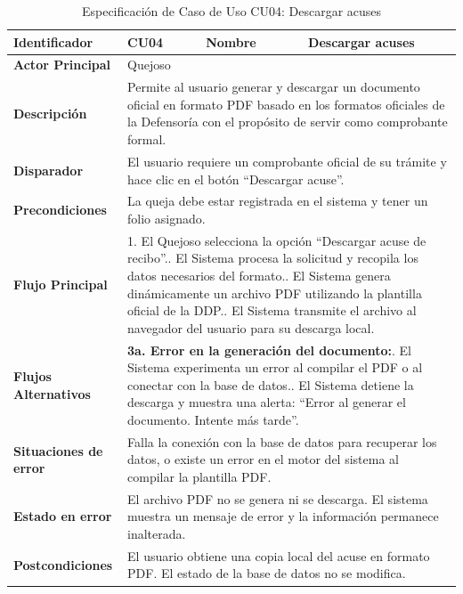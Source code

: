 \begingroup
\setlength{\parskip}{0pt}
\begin{longtable}{|p{3.5cm}|p{2cm}|p{2.5cm}|p{7cm}|}
\caption{Especificación de Caso de Uso CU04: Descargar acuses}
\label{tab:cu04_descargar_acuses} \\
\hline
\textbf{Identificador} & CU04 & \textbf{Nombre} & Descargar acuses \\ \hline
\textbf{Actor Principal} & \multicolumn{3}{p{11.5cm}|}{Quejoso} \\ \hline
\textbf{Descripción} & \multicolumn{3}{p{11.5cm}|}{Permite al usuario generar y descargar un documento oficial en formato PDF basado en los formatos oficiales de la Defensoría con el propósito de servir como comprobante formal.} \\ \hline
\textbf{Disparador} & \multicolumn{3}{p{11.5cm}|}{El usuario requiere un comprobante oficial de su trámite y hace clic en el botón ``Descargar acuse''.} \\ \hline
\textbf{Precondiciones} & \multicolumn{3}{p{11.5cm}|}{La queja debe estar registrada en el sistema y tener un folio asignado.} \\ \hline
\textbf{Flujo Principal} & \multicolumn{3}{p{11.5cm}|}{1. El Quejoso selecciona la opción ``Descargar acuse de recibo''.\newline 2. El Sistema procesa la solicitud y recopila los datos necesarios del formato.\newline 3. El Sistema genera dinámicamente un archivo PDF utilizando la plantilla oficial de la DDP.\newline 4. El Sistema transmite el archivo al navegador del usuario para su descarga local.} \\ \hline
\textbf{Flujos Alternativos} & \multicolumn{3}{p{11.5cm}|}{\textbf{3a. Error en la generación del documento:}\newline 1. El Sistema experimenta un error al compilar el PDF o al conectar con la base de datos.\newline 2. El Sistema detiene la descarga y muestra una alerta: ``Error al generar el documento. Intente más tarde''.} \\ \hline
\textbf{Situaciones de error} & \multicolumn{3}{p{11.5cm}|}{Falla la conexión con la base de datos para recuperar los datos, o existe un error en el motor del sistema al compilar la plantilla PDF.} \\ \hline
\textbf{Estado en error} & \multicolumn{3}{p{11.5cm}|}{El archivo PDF no se genera ni se descarga. El sistema muestra un mensaje de error y la información permanece inalterada.} \\ \hline
\textbf{Postcondiciones} & \multicolumn{3}{p{11.5cm}|}{El usuario obtiene una copia local del acuse en formato PDF. El estado de la base de datos no se modifica.} \\ \hline
\end{longtable}
\endgroup

